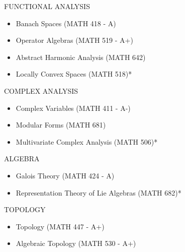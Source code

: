 \documentclass{friggeri-cv} %
\begin{document}
\begin{entrylist}


\entries
{FUNCTIONAL ANALYSIS}
{
\begin{itemize}
    \setlength\itemsep{-1em}
    \item Banach Spaces (MATH 418 - A)\\
    \item Operator Algebras (MATH 519 - A+)\\
    \item Abstract Harmonic Analysis (MATH 642)\\
    \item Locally Convex Spaces (MATH 518)*
\end{itemize}
}


\entries
{COMPLEX ANALYSIS}
{
\begin{itemize}
    \setlength\itemsep{-1em}
    \item Complex Variables (MATH 411 - A-)\\
    \item Modular Forms (MATH 681)\\
    \item Multivariate Complex Analysis (MATH 506)*
\end{itemize}
}


\entries
{ALGEBRA}
{
\begin{itemize}
    \setlength\itemsep{-1em}
    \item Galois Theory (MATH 424 - A)\\
    \item Representation Theory of Lie Algebras (MATH 682)*
\end{itemize}
}


\entries
{TOPOLOGY}
{
\begin{itemize}
    \setlength\itemsep{-1em}
    \item Topology (MATH 447 - A+)\\
    \item Algebraic Topology (MATH 530 - A+)
\end{itemize}
}



\end{entrylist}
\end{document}
